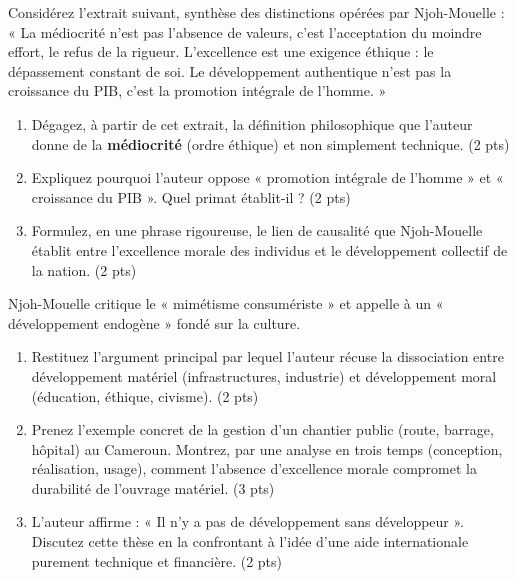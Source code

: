 \documentclass[11pt]{article}
\begin{document}
\begin{exercice}
\noindent Considérez l'extrait suivant, synthèse des distinctions opérées par Njoh-Mouelle : 
« La médiocrité n'est pas l'absence de valeurs, c'est l'acceptation du moindre effort, le refus de la rigueur. L'excellence est une exigence éthique : le dépassement constant de soi. Le développement authentique n'est pas la croissance du PIB, c'est la promotion intégrale de l'homme. »

\begin{enumerate}
\item Dégagez, à partir de cet extrait, la définition philosophique que l'auteur donne de la \textbf{médiocrité} (ordre éthique) et non simplement technique. (2 pts)
\item Expliquez pourquoi l'auteur oppose « promotion intégrale de l'homme » et « croissance du PIB ». Quel primat établit-il ? (2 pts)
\item Formulez, en une phrase rigoureuse, le lien de causalité que Njoh-Mouelle établit entre l'excellence morale des individus et le développement collectif de la nation. (2 pts)
\end{enumerate}
\end{exercice}

\begin{exercice}
\noindent Njoh-Mouelle critique le « mimétisme consumériste » et appelle à un « développement endogène » fondé sur la culture.

\begin{enumerate}
\item Restituez l'argument principal par lequel l'auteur récuse la dissociation entre développement matériel (infrastructures, industrie) et développement moral (éducation, éthique, civisme). (2 pts)
\item Prenez l'exemple concret de la gestion d'un chantier public (route, barrage, hôpital) au Cameroun. Montrez, par une analyse en trois temps (conception, réalisation, usage), comment l'absence d'excellence morale compromet la durabilité de l'ouvrage matériel. (3 pts)
\item L'auteur affirme : « Il n'y a pas de développement sans développeur ». Discutez cette thèse en la confrontant à l'idée d'une aide internationale purement technique et financière. (2 pts)
\end{enumerate}
\end{exercice}
\end{document}
